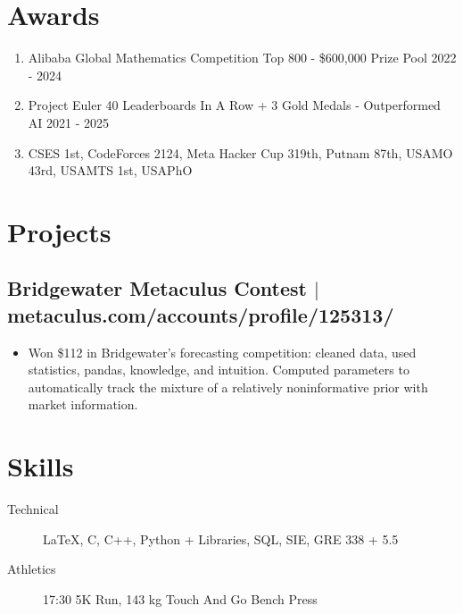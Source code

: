\documentclass[11pt]{article}
\begin{document}
\vspace{1ex}

\section{Awards}
\begin{enumerate}
	\item Alibaba Global Mathematics Competition Top 800 - \$600,000 Prize Pool \hfill 2022 - 2024
	\item Project Euler 40 Leaderboards In A Row + 3 Gold Medals - Outperformed AI \hfill 2021 - 2025
	\item CSES 1st, CodeForces 2124, Meta Hacker Cup 319th, Putnam 87th, USAMO 43rd, USAMTS 1st, USAPhO
\end{enumerate}

\vspace{1ex}

\section{Projects}
\subsection{Bridgewater Metaculus Contest $|$ {\normalfont metaculus.com/accounts/profile/125313/} \hfill {}}
\begin{itemize}
  \item Won \$112 in Bridgewater's forecasting competition: cleaned data, used statistics, pandas, knowledge, and intuition. Computed parameters to automatically track the mixture of a relatively noninformative prior with market information.
\end{itemize}

\vspace{1ex}

\section{Skills}
\begin{description}
	\item[Technical] LaTeX, C, C++, Python + Libraries, SQL, SIE, GRE 338 + 5.5
	\item[Athletics] 17:30 5K Run, 143 kg Touch And Go Bench Press
\end{description}
\end{document}
